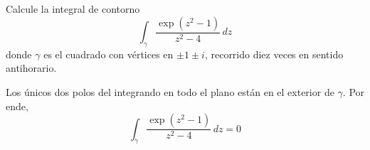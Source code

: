 \begin{exercise}
Calcule la integral de contorno
$$\int_\gamma \frac {\exp (z^2 - 1)} {z^2 - 4} \, dz$$
donde $\gamma$ es el cuadrado con vértices en $\pm 1 \pm i$, recorrido diez veces en sentido antihorario.
\end{exercise}

\begin{solution}
Los únicos dos polos del integrando en todo el plano están en el exterior de $\gamma$. Por ende,
$$\int_\gamma \frac {\exp (z^2 - 1)} {z^2 - 4} \, dz = 0$$
\end{solution}
